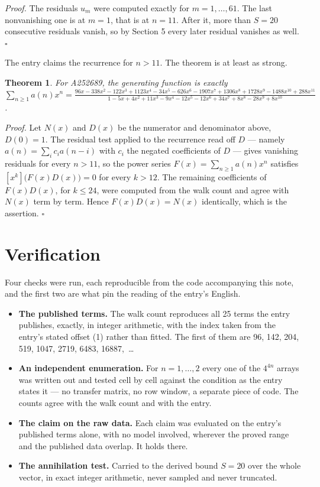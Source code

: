 \documentclass[11pt]{article}
\newtheorem{theorem}{Theorem}
\theoremstyle{definition}
\begin{document}
{\itshape Proof.} The residuals $u_m$ were computed exactly for $m = 1,\dots,61$. The last nonvanishing one is at $m = 1$, that is at $n = 11$. After it, more than $S = 20$ consecutive residuals vanish, so by Section 5 every later residual vanishes as well. $\square$

The entry claims the recurrence for $n > 11$. The theorem is at least as strong.

\begin{theorem} For A252689, the generating function is exactly $\sum_{n\ge 1} a(n)x^n = \frac{96x - 338x^{2} - 122x^{3} + 1123x^{4} - 34x^{5} - 626x^{6} - 1907x^{7} + 1306x^{8} + 1728x^{9} - 1488x^{10} + 288x^{11}}{1 - 5x + 4x^{2} + 11x^{3} - 9x^{4} - 12x^{5} - 12x^{6} + 34x^{7} + 8x^{8} - 28x^{9} + 8x^{10}}$.\end{theorem}

{\itshape Proof.} Let $N(x)$ and $D(x)$ be the numerator and denominator above, $D(0)=1$. The residual test applied to the recurrence read off $D$ --- namely $a(n) = \sum_i c_i a(n-i)$ with $c_i$ the negated coefficients of $D$ --- gives vanishing residuals for every $n > 11$, so the power series $F(x)=\sum_{n\ge 1}a(n)x^n$ satisfies $[x^k]\bigl(F(x)D(x)\bigr) = 0$ for every $k > 12$. The remaining coefficients of $F(x)D(x)$, for $k \le 24$, were computed from the walk count and agree with $N(x)$ term by term. Hence $F(x)D(x) = N(x)$ identically, which is the assertion. $\square$

\section{Verification}

Four checks were run, each reproducible from the code accompanying this note, and the first two are what pin the reading of the entry's English.

\begin{itemize}

\item {\bfseries The published terms.} The walk count reproduces all 25 terms the entry publishes, exactly, in integer arithmetic, with the index taken from the entry's stated offset (1) rather than fitted. The first of them are 96, 142, 204, 519, 1047, 2719, 6483, 16887,~\dots

\item {\bfseries An independent enumeration.} For $n = 1,\dots,2$ every one of the $4^{4n}$ arrays was written out and tested cell by cell against the condition as the entry states it --- no transfer matrix, no row window, a separate piece of code. The counts agree with the walk count and with the entry.

\item {\bfseries The claim on the raw data.} Each claim was evaluated on the entry's published terms alone, with no model involved, wherever the proved range and the published data overlap. It holds there.

\item {\bfseries The annihilation test.} Carried to the derived bound $S = 20$ over the whole vector, in exact integer arithmetic, never sampled and never truncated.

\end{itemize}
\end{document}
